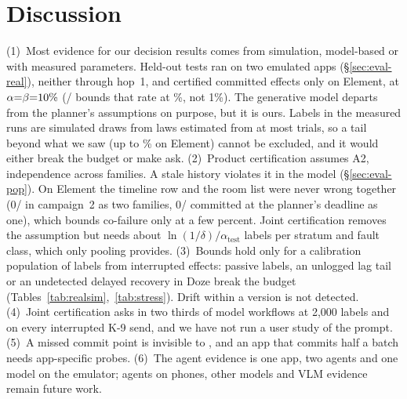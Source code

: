 \section{Discussion}
\label{sec:discussion}

(1)~Most evidence for our decision results comes from simulation, model-based or with measured parameters. Held-out tests ran on two emulated apps (\S\ref{sec:eval-real}), neither through hop~1, and certified committed effects only on Element, at $\alpha{=}\beta{=}10\%$ (\RealElPlanRetryCommitted/\RealElPlanCommittedN{} bounds that rate at \RealElPlanRetryHi\%, not 1\%). The generative model departs from the planner's assumptions on purpose,
but it is ours. \RealDataLimitation{} Labels in the measured runs are simulated draws from laws estimated from at most \RealElemN{} trials, so a tail beyond what we saw (up to \RsimTail\% on
Element) cannot be excluded, and it would either break the budget or make \sys ask.
(2)~Product certification assumes A2, independence across families. A stale history violates it in the model (\S\ref{sec:eval-pop}). On Element the timeline row and the room list were never wrong
together (0/\RealCoObs{} in campaign~2 as two families, 0/\RealElPlanCoOne{} committed at the planner's deadline as one), which bounds co-failure only at a few percent. Joint certification removes the assumption but needs about $\ln(1/\delta)/\alpha_{\mathrm{test}}$ labels
per stratum and fault class, which only pooling provides.
(3)~Bounds hold only for a calibration population of labels from interrupted effects: passive labels, an unlogged lag tail or an undetected delayed recovery in Doze break the
budget (Tables~\ref{tab:realsim},~\ref{tab:stress}). Drift within a version is not detected.
(4)~Joint certification asks in two thirds of model workflows at 2{,}000 labels and on every interrupted K-9 send, and we have not run a user study of the prompt.
(5)~A missed commit point is invisible to \sys, and an app that commits half a batch needs app-specific probes.
(6)~\label{sec:device-plan}The agent evidence is one app, two agents and one model on the emulator; agents on phones, other models and VLM evidence remain future work.


